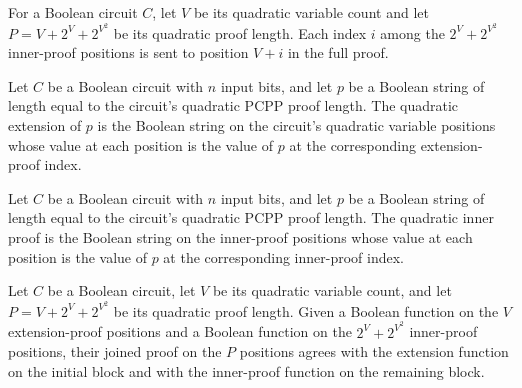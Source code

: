 \begin{definition}
\label{FABL.BooleanCircuit.circuitQuadraticInnerProofIndex}
\leanok
{}
For a Boolean circuit $C$, let $V$ be its quadratic variable count and let
$P=V+2^V+2^{V^2}$ be its quadratic proof length. Each index $i$ among the $2^V+2^{V^2}$
inner-proof positions is sent to position $V+i$ in the full proof.
\end{definition}

\begin{definition}
\label{FABL.BooleanCircuit.circuitQuadraticExtensionProof}
\leanok
{}
Let $C$ be a Boolean circuit with $n$ input bits, and let $p$ be a Boolean string of
length equal to the circuit’s quadratic PCPP proof length. The quadratic extension of
$p$ is the Boolean string on the circuit’s quadratic variable positions whose value at
each position is the value of $p$ at the corresponding extension-proof index.
\end{definition}

\begin{definition}
\label{FABL.BooleanCircuit.circuitQuadraticInnerProof}
\leanok
{}
Let $C$ be a Boolean circuit with $n$ input bits, and let $p$ be a Boolean string of
length equal to the circuit’s quadratic PCPP proof length. The quadratic inner proof is
the Boolean string on the inner-proof positions whose value at each position is the
value of $p$ at the corresponding inner-proof index.
\end{definition}

\begin{definition}
\label{FABL.BooleanCircuit.joinCircuitQuadraticProof}
\leanok
{}
Let $C$ be a Boolean circuit, let $V$ be its quadratic variable count, and let
$P=V+2^V+2^{V^2}$ be its quadratic proof length. Given a Boolean function on the $V$
extension-proof positions and a Boolean function on the $2^V+2^{V^2}$ inner-proof
positions, their joined proof on the $P$ positions agrees with the extension function on
the initial block and with the inner-proof function on the remaining block.
\end{definition}

